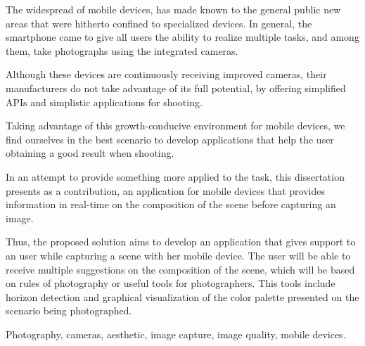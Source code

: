 \abstractEN
{}

The widespread of mobile devices, has made known to the general public new areas that were hitherto confined to specialized devices. In general, the smartphone came to give all users the ability to realize multiple tasks, and among them, take photographs using the integrated cameras.


Although these devices are continuously receiving improved cameras, their manufacturers do not take advantage of its full potential, by offering simplified APIs and simplistic applications for shooting.


Taking advantage of this growth-conducive environment for mobile devices, we find ourselves in the best scenario to develop applications that help the user obtaining a good result when shooting.


In an attempt to provide something more applied to the task, this dissertation presents as a contribution, an application for mobile devices that provides information in real-time on the composition of the scene before capturing an image.

Thus, the proposed solution aims to develop an application that gives support to an user while capturing a scene with her mobile device. The user will be able to receive multiple suggestions on the composition of the scene, which will be based on rules of photography or useful tools for photographers. This tools include horizon detection and graphical visualization of the color palette presented on the scenario being photographed.

\begin{keywords}
Photography, cameras, aesthetic, image capture, image quality, mobile devices.
\end{keywords}
